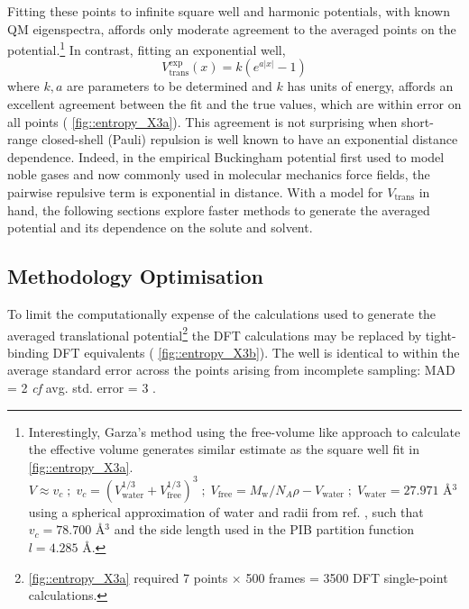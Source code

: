 \documentclass[../main.tex]{subfiles}
\begin{document}
Fitting these points to infinite square well and harmonic potentials, with known QM eigenspectra, affords only moderate agreement to the averaged points on the potential.\footnote{Interestingly, Garza's method using the free-volume like approach to calculate the effective volume generates similar estimate as the square well fit in \figurename{ \ref{fig::entropy_X3a}}. $V \approx v_c \; ; \; v_c = (V_\text{water}^{1/3} + V_\text{free}^{1/3})^3 \; ; \; V_\text{free} = M_\text{w} / N_A \rho - V_\text{water} \; ;\; V_\text{water} = 27.971$ \AA${}^3$ using a spherical approximation of water and radii from ref. \cite{CRC}
, such that $v_c = 78.700$ \AA${}^3$ and the side length used in the PIB partition function $l = 4.285$ \AA.} In contrast, fitting an exponential well,
\begin{equation}
V_\text{trans}^\text{exp}(x) = k (e^{a|x|} - 1)
\end{equation}
where $k, a$ are parameters to be determined and $k$ has units of energy, affords an excellent agreement between the fit and the true values, which are within error on all points (\figurename{ \ref{fig::entropy_X3a}}). This agreement is not surprising when short-range closed-shell (Pauli) repulsion is well known to have an exponential distance dependence.\cite{Bolliger2013} Indeed, in the empirical Buckingham potential first used to model noble gases and now commonly used in molecular mechanics force fields, the pairwise repulsive term is exponential in distance.\cite{Buckingham1938} With a model for $V_\text{trans}$ in hand, the following sections explore faster methods to generate the averaged potential and its dependence on the solute and solvent.

\newpage
\subsection{Methodology Optimisation}
To limit the computationally expense of the calculations used to generate the averaged translational potential\footnote{\figurename{ \ref{fig::entropy_X3a}} required 7 points $\times$ 500 frames = 3500 DFT single-point calculations.} the DFT calculations may be replaced by tight-binding DFT equivalents (\figurename{ \ref{fig::entropy_X3b}}). The well is identical to within the average standard error across the points arising from incomplete sampling: MAD = 2 \kcal \emph{ cf} avg. std. error = 3 \kcal.
\end{document}
